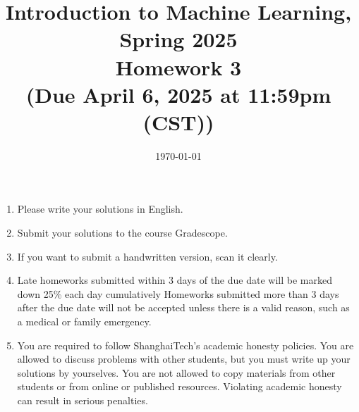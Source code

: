 \documentclass[10pt]{article}
\begin{document}
\date{\today}
\title{Introduction to Machine Learning, Spring 2025 \\
	Homework 3 \\
	\small (Due April 6, 2025 at 11:59pm (CST))}
\maketitle

\begin{enumerate}
	\item Please write your solutions in English.
	\item Submit your solutions to the course Gradescope.
	\item If you want to submit a handwritten version, scan it clearly.
	\item Late homeworks submitted within 3 days of the due date will be marked down 25\% each day cumulatively Homeworks submitted more than 3 days after the due date will not be accepted unless there is a valid reason, such as a medical or family emergency.
	\item You are required to follow ShanghaiTech's academic honesty policies.  You are allowed to discuss problems with other students, but you must write up your solutions by yourselves.  You are not allowed to copy materials from other students or from online or published resources.  Violating academic honesty can result in serious penalties.
	\end{enumerate}
\newpage


\begin{enumerate}





\end{enumerate}
\end{document}
